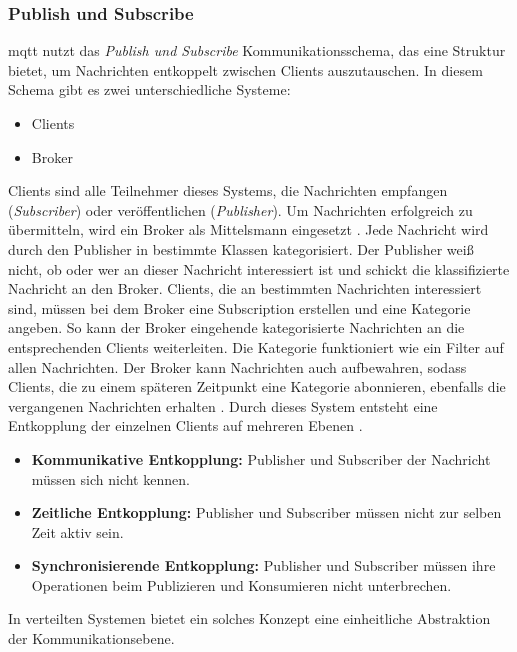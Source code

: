 \subsubsection{Publish und Subscribe} \label{s:publish-subscribe}
\ac{mqtt} nutzt das \textit{Publish und Subscribe} Kommunikationsschema, das eine Struktur bietet, um Nachrichten entkoppelt zwischen Clients auszutauschen. In diesem Schema gibt es zwei unterschiedliche Systeme:
\begin{itemize}
    \item Clients
    \item Broker
\end{itemize}
Clients sind alle Teilnehmer dieses Systems, die Nachrichten empfangen (\textit{Subscriber}) oder veröffentlichen (\textit{Publisher}). Um Nachrichten erfolgreich zu übermitteln, wird ein Broker als Mittelsmann eingesetzt \cite{teamGettingStartedMQTT}.
Jede Nachricht wird durch den Publisher in bestimmte Klassen kategorisiert. Der Publisher wei{\ss} nicht, ob oder wer an dieser Nachricht interessiert ist und schickt die klassifizierte Nachricht an den Broker.
Clients, die an bestimmten Nachrichten interessiert sind, müssen bei dem Broker eine Subscription erstellen und eine Kategorie angeben.
So kann der Broker eingehende kategorisierte Nachrichten an die entsprechenden Clients weiterleiten. Die Kategorie funktioniert wie ein Filter auf allen Nachrichten.
Der Broker kann Nachrichten auch aufbewahren, sodass Clients, die zu einem späteren Zeitpunkt eine Kategorie abonnieren, ebenfalls die vergangenen Nachrichten erhalten \cite[S.~295]{tarkomaPublishSubscribeSystems2012}.
Durch dieses System entsteht eine Entkopplung der einzelnen Clients auf mehreren Ebenen \cite{teamPublishSubscribeMQTT}.
\begin{itemize}
    \item \textbf{Kommunikative Entkopplung:} Publisher und Subscriber der Nachricht müssen sich nicht kennen.
    \item \textbf{Zeitliche Entkopplung:} Publisher und Subscriber müssen nicht zur selben Zeit aktiv sein.
    \item \textbf{Synchronisierende Entkopplung:} Publisher und Subscriber müssen ihre Operationen beim Publizieren und Konsumieren nicht unterbrechen.
\end{itemize}
In verteilten Systemen bietet ein solches Konzept eine einheitliche Abstraktion der Kommunikationsebene.
